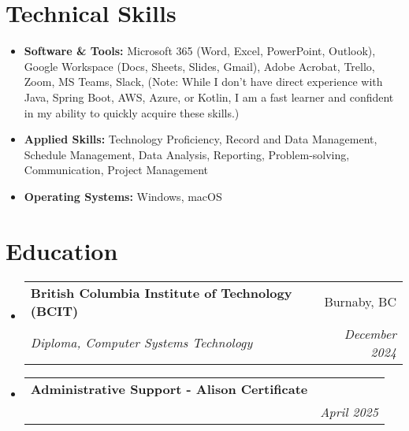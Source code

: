 \documentclass[letterpaper,11pt]{article}
\makeatletter
\newcommand{\resumeItem}[1]{
\item\small{
{#1 \vspace{-2pt}}
}
}
\newcommand{\resumeSubheading}[4]{
\vspace{-2pt}\item
\begin{tabular*}{0.97\textwidth}[t]{l@{\extracolsep{\fill}}r}
\textbf{#1} & #2 \\
\textit{\small#3} & \textit{\small #4} \\
\end{tabular*}\vspace{-7pt}
}
\newcommand{\resumeSubHeadingListStart}{\begin{itemize}[leftmargin=0.15in, label={}]}
\newcommand{\resumeSubHeadingListEnd}{\end{itemize}}
\makeatother
\begin{document}
\section{Technical Skills}
\resumeSubHeadingListStart
\resumeItem{\textbf{Software \& Tools:} Microsoft 365 (Word, Excel, PowerPoint, Outlook), Google Workspace (Docs, Sheets, Slides, Gmail), Adobe Acrobat, Trello, Zoom, MS Teams, Slack,  (Note:  While I don't have direct experience with Java, Spring Boot, AWS, Azure, or Kotlin, I am a fast learner and confident in my ability to quickly acquire these skills.)}
\resumeItem{\textbf{Applied Skills:} Technology Proficiency, Record and Data Management, Schedule Management, Data Analysis, Reporting, Problem-solving, Communication, Project Management}
\resumeItem{\textbf{Operating Systems:} Windows, macOS}
\resumeSubHeadingListEnd

\section{Education}
\resumeSubHeadingListStart
\resumeSubheading{British Columbia Institute of Technology (BCIT)}{Burnaby, BC}{Diploma, Computer Systems Technology}{December 2024}
\resumeSubheading{Administrative Support - Alison Certificate}{}{}{April 2025}
\resumeSubHeadingListEnd
\end{document}
